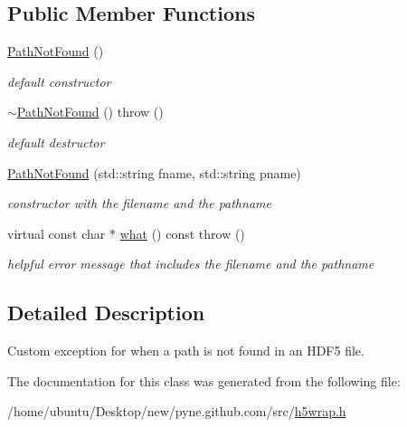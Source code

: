 \subsection*{Public Member Functions}
\begin{DoxyCompactItemize}
\item 
\hyperlink{classh5wrap_1_1_path_not_found_a7b05229fb4f02920732f22622af1f08e}{Path\+Not\+Found} ()\hypertarget{classh5wrap_1_1_path_not_found_a7b05229fb4f02920732f22622af1f08e}{}\label{classh5wrap_1_1_path_not_found_a7b05229fb4f02920732f22622af1f08e}

\begin{DoxyCompactList}\small\item\em default constructor \end{DoxyCompactList}\item 
\hyperlink{classh5wrap_1_1_path_not_found_acf9696ccdfb4a4c63454dbfc1dcde060}{$\sim$\+Path\+Not\+Found} ()  throw ()\hypertarget{classh5wrap_1_1_path_not_found_acf9696ccdfb4a4c63454dbfc1dcde060}{}\label{classh5wrap_1_1_path_not_found_acf9696ccdfb4a4c63454dbfc1dcde060}

\begin{DoxyCompactList}\small\item\em default destructor \end{DoxyCompactList}\item 
\hyperlink{classh5wrap_1_1_path_not_found_aaedd26703acced17206eb8dabd4c5274}{Path\+Not\+Found} (std\+::string fname, std\+::string pname)\hypertarget{classh5wrap_1_1_path_not_found_aaedd26703acced17206eb8dabd4c5274}{}\label{classh5wrap_1_1_path_not_found_aaedd26703acced17206eb8dabd4c5274}

\begin{DoxyCompactList}\small\item\em constructor with the filename and the pathname \end{DoxyCompactList}\item 
virtual const char $\ast$ \hyperlink{classh5wrap_1_1_path_not_found_ad454d14e0f9f44f4357a5c33a7017b88}{what} () const   throw ()\hypertarget{classh5wrap_1_1_path_not_found_ad454d14e0f9f44f4357a5c33a7017b88}{}\label{classh5wrap_1_1_path_not_found_ad454d14e0f9f44f4357a5c33a7017b88}

\begin{DoxyCompactList}\small\item\em helpful error message that includes the filename and the pathname \end{DoxyCompactList}\end{DoxyCompactItemize}


\subsection{Detailed Description}
Custom exception for when a path is not found in an H\+D\+F5 file. 

The documentation for this class was generated from the following file\+:\begin{DoxyCompactItemize}
\item 
/home/ubuntu/\+Desktop/new/pyne.\+github.\+com/src/\hyperlink{h5wrap_8h}{h5wrap.\+h}\end{DoxyCompactItemize}

